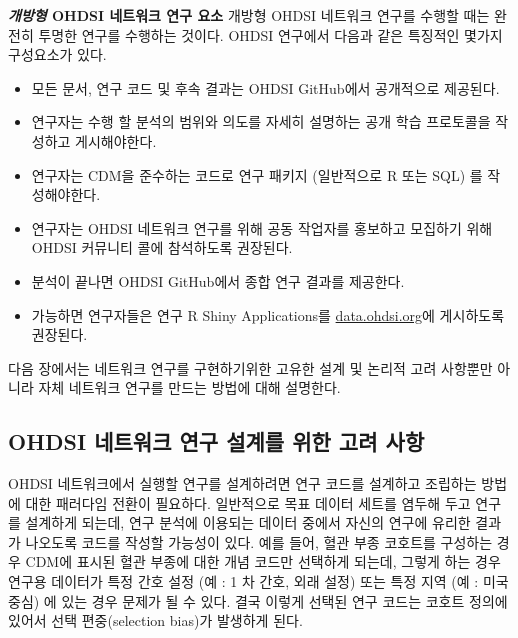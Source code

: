 \documentclass[11pt]{book}
\providecommand{\tightlist}{%
  \setlength{\itemsep}{0pt}\setlength{\parskip}{0pt}}
\theoremstyle{definition}
\theoremstyle{definition}
\theoremstyle{definition}
\theoremstyle{remark}
\begin{document}
\textbf{\emph{개방형} OHDSI 네트워크 연구 요소} 개방형 OHDSI 네트워크
연구를 수행할 때는 완전히 투명한 연구를 수행하는 것이다. OHDSI 연구에서
다음과 같은 특징적인 몇가지 구성요소가 있다.

\begin{itemize}
\tightlist
\item
  모든 문서, 연구 코드 및 후속 결과는 OHDSI GitHub에서 공개적으로
  제공된다.
\item
  연구자는 수행 할 분석의 범위와 의도를 자세히 설명하는 공개 학습
  프로토콜을 작성하고 게시해야한다.
\item
  연구자는 CDM을 준수하는 코드로 연구 패키지 (일반적으로 R 또는 SQL) 를
  작성해야한다.
\item
  연구자는 OHDSI 네트워크 연구를 위해 공동 작업자를 홍보하고 모집하기
  위해 OHDSI 커뮤니티 콜에 참석하도록 권장된다.
\item
  분석이 끝나면 OHDSI GitHub에서 종합 연구 결과를 제공한다.
\item
  가능하면 연구자들은 연구 R Shiny Applications를
  \href{http://data.ohdsi.org}{data.ohdsi.org}에 게시하도록 권장된다.
\end{itemize}

다음 장에서는 네트워크 연구를 구현하기위한 고유한 설계 및 논리적 고려
사항뿐만 아니라 자체 네트워크 연구를 만드는 방법에 대해 설명한다.

\subsection{OHDSI 네트워크 연구 설계를 위한 고려
사항}\label{ohdsi------}


OHDSI 네트워크에서 실행할 연구를 설계하려면 연구 코드를 설계하고
조립하는 방법에 대한 패러다임 전환이 필요하다. 일반적으로 목표 데이터
세트를 염두해 두고 연구를 설계하게 되는데, 연구 분석에 이용되는 데이터
중에서 자신의 연구에 유리한 결과가 나오도록 코드를 작성할 가능성이 있다.
예를 들어, 혈관 부종 코호트를 구성하는 경우 CDM에 표시된 혈관 부종에
대한 개념 코드만 선택하게 되는데, 그렇게 하는 경우 연구용 데이터가 특정
간호 설정 (예 : 1 차 간호, 외래 설정) 또는 특정 지역 (예 : 미국 중심) 에
있는 경우 문제가 될 수 있다. 결국 이렇게 선택된 연구 코드는 코호트
정의에 있어서 선택 편중(selection bias)가 발생하게 된다.
\end{document}
